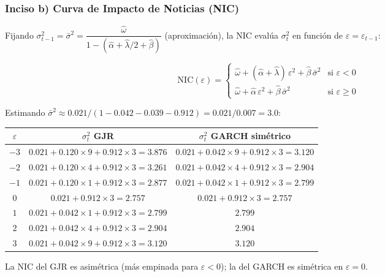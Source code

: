 \documentclass[12pt,a4paper]{article}
\begin{document}
\subsubsection*{Inciso b) Curva de Impacto de Noticias (NIC)}

\begin{solucion}
Fijando $\sigma_{t-1}^2=\bar{\sigma}^2=\dfrac{\hat{\omega}}{1-(\hat{\alpha}+\hat{\lambda}/2+\hat{\beta})}$ (aproximación), la NIC evalúa $\sigma_t^2$ en función de $\varepsilon=\varepsilon_{t-1}$:

\begin{equation}
\text{NIC}(\varepsilon) =
\begin{cases}
\hat{\omega} + (\hat{\alpha}+\hat{\lambda})\,\varepsilon^2 + \hat{\beta}\,\bar{\sigma}^2 & \text{si } \varepsilon < 0\\
\hat{\omega} + \hat{\alpha}\,\varepsilon^2 + \hat{\beta}\,\bar{\sigma}^2 & \text{si } \varepsilon \geq 0
\end{cases}
\end{equation}

Estimando $\bar{\sigma}^2\approx0.021/(1-0.042-0.039-0.912)=0.021/0.007=3.0$:

\begin{center}
\begin{tabular}{ccc}
\toprule
$\varepsilon$ & $\sigma_t^2$ GJR & $\sigma_t^2$ GARCH simétrico \\
\midrule
$-3$ & $0.021+0.120\times9+0.912\times3=3.876$ & $0.021+0.042\times9+0.912\times3=3.120$ \\
$-2$ & $0.021+0.120\times4+0.912\times3=3.261$ & $0.021+0.042\times4+0.912\times3=2.904$ \\
$-1$ & $0.021+0.120\times1+0.912\times3=2.877$ & $0.021+0.042\times1+0.912\times3=2.799$ \\
$0$  & $0.021+0.912\times3=2.757$ & $0.021+0.912\times3=2.757$ \\
$1$  & $0.021+0.042\times1+0.912\times3=2.799$ & $2.799$ \\
$2$  & $0.021+0.042\times4+0.912\times3=2.904$ & $2.904$ \\
$3$  & $0.021+0.042\times9+0.912\times3=3.120$ & $3.120$ \\
\bottomrule
\end{tabular}
\end{center}

La NIC del GJR es asimétrica (más empinada para $\varepsilon<0$); la del GARCH es simétrica en $\varepsilon=0$.
\end{solucion}
\end{document}
